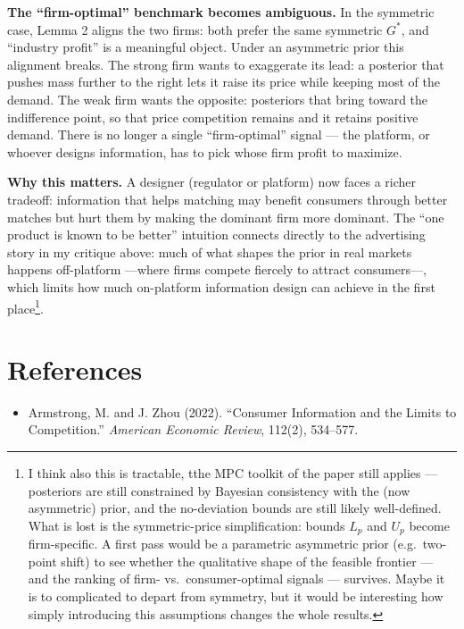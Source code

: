 \documentclass[12pt, a4paper]{article}
\begin{document}
\textbf{The ``firm-optimal'' benchmark becomes ambiguous.} In the symmetric case, Lemma 2 aligns the two firms: both prefer the same symmetric $G^*$, and ``industry profit'' is a meaningful object. Under an asymmetric prior this alignment breaks. The strong firm wants to exaggerate its lead: a posterior that pushes mass further to the right lets it raise its price while keeping most of the demand. The weak firm wants the opposite: posteriors that bring toward the indifference point, so that price competition remains and it retains positive demand. There is no longer a single ``firm-optimal'' signal --- the platform, or whoever designs information, has to pick whose firm profit to maximize.

\textbf{Why this matters.} A designer (regulator or platform) now faces a richer tradeoff: information that helps matching may benefit consumers through better matches but hurt them by making the dominant firm more dominant. The ``one product is known to be better'' intuition connects directly to the advertising story in my critique above: much of what shapes the prior in real markets happens off-platform ---where firms compete fiercely to attract consumers---, which limits how much on-platform information design can achieve in the first place\footnote{I think also this is tractable, tthe MPC toolkit of the paper still applies --- posteriors are still constrained by Bayesian consistency with the (now asymmetric) prior, and the no-deviation bounds are still likely well-defined. What is lost is the symmetric-price simplification: bounds $L_p$ and $U_p$ become firm-specific. A first pass would be a parametric asymmetric prior (e.g.\ two-point shift) to see whether the qualitative shape of the feasible frontier --- and the ranking of firm- vs.\ consumer-optimal signals --- survives. Maybe it is to complicated to depart from symmetry, but it would be interesting how simply introducing this assumptions changes the whole results. }.

\section*{References}

\begin{itemize}[nosep, leftmargin=*]
    \item Armstrong, M. and J. Zhou (2022). ``Consumer Information and the Limits to Competition.'' \textit{American Economic Review}, 112(2), 534--577.
\end{itemize}
\end{document}
